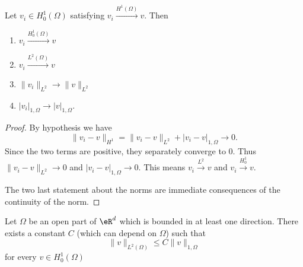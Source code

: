 \begin{lemma}       \label{LEMooEVQKooYoZmbH}
	Let \( v_i\in H_0^1(\Omega)\) satisfying \( v_i\stackrel{H^1(\Omega)}{\longrightarrow}v\). Then
	\begin{enumerate}
		\item
		      \( v_i\stackrel{H_0^1(\Omega)}{\longrightarrow}v\)
		\item
		      \( v_i\stackrel{L^2(\Omega)}{\longrightarrow}v\)
		\item
		      \( \| v_i \|_{L^2}\to \| v \|_{L^2}\)
		\item
		      \( | v_i |_{1,\Omega}\to | v |_{1,\Omega}\).
	\end{enumerate}
\end{lemma}

\begin{proof}
	By hypothesis we have
	\begin{equation}
		\| v_i-v \|_{H^1}=\| v_i-v \|_{L^2}+| v_i-v |_{1,\Omega}\to 0.
	\end{equation}
	Since the two terms are positive, they separately converge to \( 0\). Thus \( \| v_i-v \|_{L^2}\to 0\) and \( | v_i-v |_{1,\Omega}\to 0\). This means \( v_i\stackrel{L^2}{\longrightarrow}v\) and \( v_i\stackrel{H_0^1}{\longrightarrow}v\).

	The two last statement about the norms are immediate consequences of the continuity of the norm.
\end{proof}

\begin{theorem}        \label{THOooMIHQooYShOps}
	Let \( \Omega\) be an open part of \( \eR^d\) which is bounded in at least one direction. There exists a constant \( C\) (which can depend on \( \Omega\)) such that
	\begin{equation}
		\| v \|_{L^2(\Omega)}\leq C\| v \|_{1,\Omega}
	\end{equation}
	for every \( v\in H_0^1(\Omega)\)
\end{theorem}

